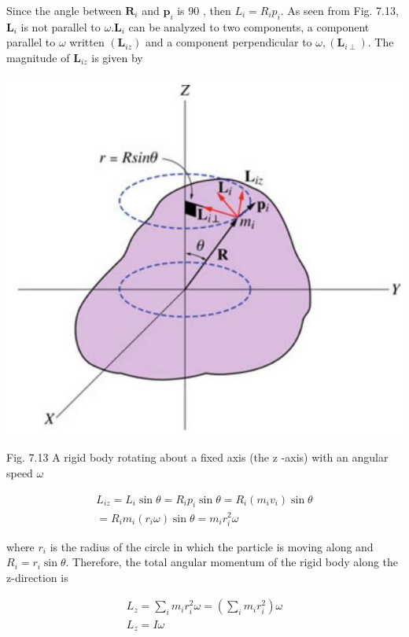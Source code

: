 \documentclass[10pt]{article}
\begin{document}
Since the angle between $\mathbf{R}_{i}$ and $\mathbf{p}_{i}$ is 90 , then $L_{i}=R_{i} p_{i}$. As seen from Fig. 7.13, $\mathbf{L}_{i}$ is not parallel to $\omega . \mathbf{L}_{i}$ can be analyzed to two components, a component parallel to $\omega$ written $\left(\mathbf{L}_{i z}\right)$ and a component perpendicular to $\omega,\left(\mathbf{L}_{i \perp}\right)$. The magnitude of $\mathbf{L}_{i z}$ is given by

\begin{center}
\includegraphics[max width=\textwidth]{2024_09_13_db1f357d2aad0a03eb2eg-118}
\end{center}

Fig. 7.13 A rigid body rotating about a fixed axis (the z -axis) with an angular speed $\omega$

$$
\begin{gathered}
L_{i z}=L_{i} \sin \theta=R_{i} p_{i} \sin \theta=R_{i}\left(m_{i} v_{i}\right) \sin \theta \\
=R_{i} m_{i}\left(r_{i} \omega\right) \sin \theta=m_{i} r_{i}^{2} \omega
\end{gathered}
$$

where $r_{i}$ is the radius of the circle in which the particle is moving along and $R_{i}=r_{i} \sin \theta$. Therefore, the total angular momentum of the rigid body along the z-direction is

$$
\begin{gathered}
L_{z}=\sum_{i} m_{i} r_{i}^{2} \omega=\left(\sum_{i} m_{i} r_{i}^{2}\right) \omega \\
L_{z}=I \omega
\end{gathered}
$$
\end{document}
